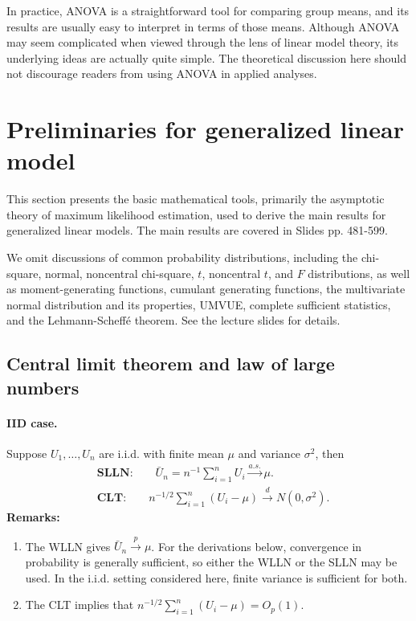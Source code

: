 \documentclass{article}
\theoremstyle{break}
\begin{document}
In practice, ANOVA is a straightforward tool for comparing group means, and its results are usually easy to interpret in terms of those means. Although ANOVA may seem complicated when viewed through the lens of linear model theory, its underlying ideas are actually quite simple. The theoretical discussion here should not discourage readers from using ANOVA in applied analyses.



\section{Preliminaries for generalized linear model}\label{sec:prelim-glm}
This section presents the basic mathematical tools, primarily the asymptotic theory of maximum likelihood estimation, used to derive the main results for generalized linear models. 
The main results are covered in Slides pp. 481-599.

We omit discussions of common probability distributions, including the chi-square, normal, noncentral chi-square, $t$, noncentral $t$, and $F$ distributions, as well as moment-generating functions, cumulant generating functions, the multivariate normal distribution and its properties, UMVUE, complete sufficient statistics, and the Lehmann-Scheffé theorem. See the lecture slides for details.

\subsection{Central limit theorem and law of large numbers}\label{sec:prelim-glm-clt-lln}
\paragraph{IID case.} Suppose $U_1, \ldots, U_n$ are i.i.d. with finite mean $\mu$ and variance $\sigma^2$, then
\begin{align*}
    & \textbf{SLLN:}\qquad \bar{U}_n = n^{-1} \sum_{i=1}^n U_i \stackrel{a.s.}{\to} \mu.\\
    & \textbf{CLT:}\qquad n^{-1/2} \sum_{i=1}^n (U_i - \mu) \stackrel{d}{\to} N(0, \sigma^2).
\end{align*}
\textbf{Remarks:}
\begin{enumerate}
    \item The WLLN gives $\bar{U}_n \stackrel{p}{\to} \mu$. For the derivations below, convergence in probability is generally sufficient, so either the WLLN or the SLLN may be used. In the i.i.d. setting considered here, finite variance is sufficient for both.
    \item The CLT implies that $n^{-1/2} \sum_{i=1}^n (U_i - \mu) = O_p(1)$.
\end{enumerate}
\end{document}
